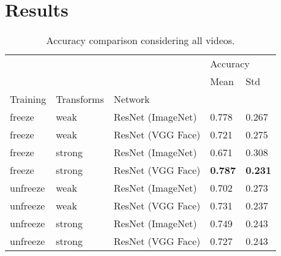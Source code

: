 
\section{Results}

\begin{table}[h!tp]
\centering
\caption{Accuracy comparison considering all videos.}
\label{tab:accuracy_all}
\begin{tabular}{lllll}
\toprule
         &        &          & \multicolumn{2}{l}{Accuracy} \\
         &        &          &     Mean &    Std \\
Training & Transforms & Network &          &        \\
\midrule
freeze   & weak   & ResNet (ImageNet) &    0.778 &  0.267 \\
freeze   & weak   & ResNet (VGG Face) &    0.721 &  0.275 \\
freeze   & strong & ResNet (ImageNet) &    0.671 &  0.308 \\
freeze   & strong & ResNet (VGG Face) &    \textbf{0.787} & \textbf{ 0.231} \\
unfreeze & weak   & ResNet (ImageNet) &    0.702 &  0.273 \\
unfreeze & weak   & ResNet (VGG Face) &    0.731 &  0.237 \\
unfreeze & strong & ResNet (ImageNet) &    0.749 &  0.243 \\
unfreeze & strong & ResNet (VGG Face) &    0.727 &  0.243 \\
\bottomrule
\end{tabular}
\end{table}

